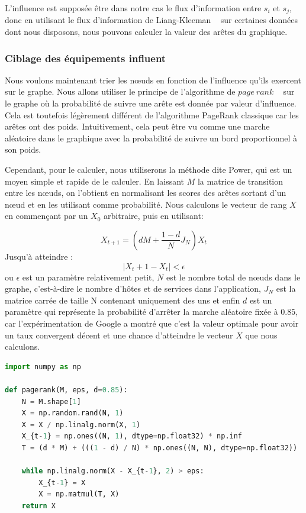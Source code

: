 \documentclass[10pt,a4paper,oneside]{article}
\begin{document}
\begin{multicols}{2}
L’influence est supposée être dans notre cas le flux d’information entre $s_i$ et $s_j$, donc en utilisant le flux d’information de Liang-Kleeman ~\cite{ref3} sur certaines données dont nous disposons, nous pouvons calculer la valeur des arêtes du graphique.

\subsubsection{Ciblage des équipements influent}
Nous voulons maintenant trier les nœuds en fonction de l’influence qu’ils exercent sur le graphe. Nous allons utiliser le principe de l'algorithme de $page~rank$ ~\cite{ref4} sur le graphe où la probabilité de suivre une arête est donnée par valeur d'influence. Cela est toutefois légèrement différent de l'algorithme PageRank classique car les arêtes ont des poids. Intuitivement, cela peut être vu comme une marche aléatoire dans le graphique avec la probabilité de suivre un bord proportionnel à son poids.

Cependant, pour le calculer, nous utiliserons la méthode dite Power, qui est un moyen simple et rapide de le calculer. En laissant $M$ la matrice de transition entre les nœuds, on l'obtient en normalisant les scores des arêtes sortant d'un nœud et en les utilisant comme probabilité. Nous calculons le vecteur de rang $X$ en commençant par un $X_0$ arbitraire, puis en utilisant:

	\[X_{t+1} = (dM + \frac{1-d}{N}J_N)X_t\]
Jusqu'à atteindre :
	\[ \mid{X_t+1 - X_t}\mid < \epsilon\]
ou $\epsilon$ est un paramètre relativement petit, $N$ est le nombre total de nœuds dans le graphe, c’est-à-dire le nombre d’hôtes et de services dans l’application, $J_N$ est la matrice carrée de taille N contenant uniquement des uns et enfin $d$ est un paramètre qui représente la probabilité d’arrêter la marche aléatoire fixée à $0.85$, car l’expérimentation de Google a montré que c’est la valeur optimale pour avoir un taux convergent décent et une chance d’atteindre le vecteur $X$ que nous calculons.
\end{multicols}

\begin{lstlisting}[language=Python, caption=Methode Power en Python]
import numpy as np

def pagerank(M, eps, d=0.85):
    N = M.shape[1]
    X = np.random.rand(N, 1)
    X = X / np.linalg.norm(X, 1)
    X_{t-1} = np.ones((N, 1), dtype=np.float32) * np.inf
    T = (d * M) + (((1 - d) / N) * np.ones((N, N), dtype=np.float32))
    
    while np.linalg.norm(X - X_{t-1}, 2) > eps: 
        X_{t-1} = X
        X = np.matmul(T, X)
    return X

\end{lstlisting}
\end{document}
